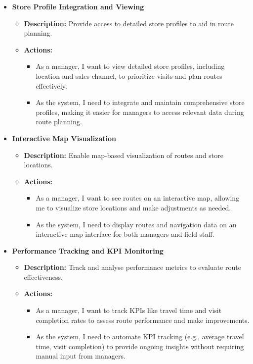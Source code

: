 \begin{itemize}
    \item \textbf{Store Profile Integration and Viewing}
    \begin{itemize}
        \item \textbf{Description:} Provide access to detailed store profiles to aid in route planning.
        \item \textbf{Actions:}
        \begin{itemize}
            \item As a manager, I want to view detailed store profiles, including location and sales channel, to prioritize visits and plan routes effectively.
            \item As the system, I need to integrate and maintain comprehensive store profiles, making it easier for managers to access relevant data during route planning.
        \end{itemize}
    \end{itemize}
    
    \item \textbf{Interactive Map Visualization}
    \begin{itemize}
        \item \textbf{Description:} Enable map-based visualization of routes and store locations.
        \item \textbf{Actions:}
        \begin{itemize}
            \item As a manager, I want to see routes on an interactive map, allowing me to visualize store locations and make adjustments as needed.
            \item As the system, I need to display routes and navigation data on an interactive map interface for both managers and field staff.
        \end{itemize}
    \end{itemize}
    
    \item \textbf{Performance Tracking and KPI Monitoring}
    \begin{itemize}
        \item \textbf{Description:} Track and analyse performance metrics to evaluate route effectiveness.
        \item \textbf{Actions:}
        \begin{itemize}
            \item As a manager, I want to track KPIs like travel time and visit completion rates to assess route performance and make improvements.
            \item As the system, I need to automate KPI tracking (e.g., average travel time, visit completion) to provide ongoing insights without requiring manual input from managers.
        \end{itemize}
    \end{itemize}
    

\end{itemize}
